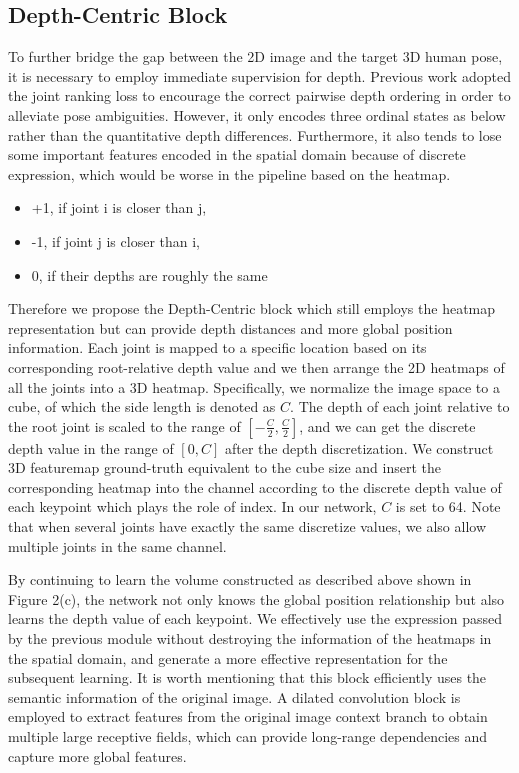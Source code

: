 \documentclass[letterpaper]{article} \usepackage{aaai21}  \usepackage{times}  \usepackage{helvet} \usepackage{courier}  \usepackage[hyphens]{url}  \usepackage{graphicx} \urlstyle{rm} \def\UrlFont{\rm}  \usepackage{natbib}  \usepackage{caption} \frenchspacing  \setlength{\pdfpagewidth}{8.5in}  \setlength{\pdfpageheight}{11in}
\begin{document}
\subsection{Depth-Centric Block}
\label{sec3}

To further bridge the gap between the 2D image and the target 3D human pose, it is necessary to employ immediate supervision for depth. Previous work \cite{pavlakos2018ordinal} adopted the joint ranking loss to encourage the correct pairwise depth ordering in order to alleviate pose ambiguities. However, it only encodes three ordinal states as below rather than the quantitative depth differences. Furthermore, it also tends to lose some important features encoded in the spatial domain because of discrete expression, which would be worse in the pipeline based on the heatmap.

\begin{itemize}[leftmargin = 50pt]
\item +1, if joint i is closer than j,
\item -1, if joint j is closer than i,
\item 0, if their depths are roughly the same 
\end{itemize}


Therefore we propose the Depth-Centric block which still employs the heatmap representation but can provide depth distances and more global position information. Each joint is mapped to a specific location based on its corresponding root-relative depth value and we then arrange the 2D heatmaps of all the joints into a 3D heatmap. Specifically, we normalize the image space to a cube, of which the side length is denoted as $C$. The depth of each joint relative to the root joint is scaled to the range of $[-\frac {C} 2, \frac C 2]$, and we can get the discrete depth value in the range of $[0,C]$ after the depth discretization. We construct 3D featuremap ground-truth equivalent to the cube size and insert the corresponding heatmap into the channel according to the discrete depth value of each keypoint which plays the role of index. In our network, $C$ is set to 64. Note that when several joints have exactly the same discretize values, we also allow multiple joints in the same channel. 


By continuing to learn the volume constructed as described above shown in Figure 2(c), the network not only knows the global position relationship but also learns the depth value of each keypoint. We effectively use the expression passed by the previous module without destroying the information of the heatmaps in the spatial domain, and generate a more effective representation for the subsequent learning. It is worth mentioning that this block efficiently uses the semantic information of the original image. A dilated convolution block is employed to extract features from the original image context branch to obtain multiple large receptive fields, which can provide long-range dependencies and capture more global features.
\end{document}
